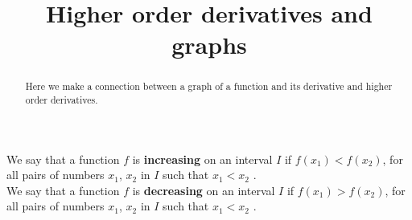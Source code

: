 \documentclass{ximera}
\title[Dig-In:]{Higher order derivatives and graphs}
\begin{document}
\begin{abstract}
 Here we make a connection between a graph of a function and its derivative and higher order derivatives.   
\end{abstract}
\maketitle
\begin{definition}
We say that a function $f$ is \textbf{increasing} on an interval $I$ if $f(x_{1})<f(x_{2})$, for all pairs of numbers $x_{1}$, $x_{2}$ in $I$ such that $x_{1}<x_{2}$ .\\
We say that a function $f$ is \textbf{decreasing} on an interval $I$ if $f(x_{1})>f(x_{2})$, for all pairs of numbers $x_{1}$, $x_{2}$ in $I$ such that $x_{1}<x_{2}$ .\\
 \end{definition}
\end{document}
